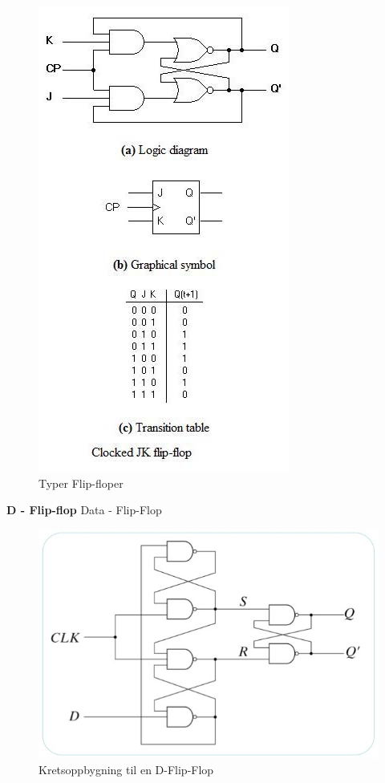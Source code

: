 \documentclass{article}
\begin{document}
	\begin{figure}[H]
		\includegraphics[scale = 0.6]{jkFlip2.jpg}
		\caption{Typer Flip-floper}
	\end{figure}
	
	\textbf{D - Flip-flop}
	Data - Flip-Flop
	
	\begin{figure}[H]
		\includegraphics[scale = 0.6]{dFlip.jpg}
		\caption{Kretsoppbygning til en D-Flip-Flop}
	\end{figure}
	
\end{document}
